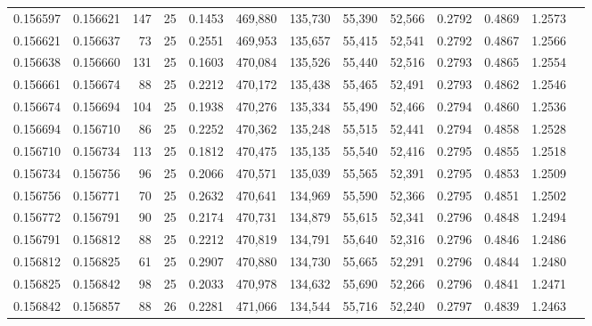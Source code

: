 \begin{tabular}{rrrrrrrrrrrrr}
0.156597 & 0.156621 &   147 &  25 &                                     0.1453 & 469,880 & 135,730 &  55,390 &  52,566 & 0.2792 & 0.4869 & 1.2573 \\
0.156621 & 0.156637 &    73 &  25 &                                     0.2551 & 469,953 & 135,657 &  55,415 &  52,541 & 0.2792 & 0.4867 & 1.2566 \\
0.156638 & 0.156660 &   131 &  25 &                                     0.1603 & 470,084 & 135,526 &  55,440 &  52,516 & 0.2793 & 0.4865 & 1.2554 \\
0.156661 & 0.156674 &    88 &  25 &                                     0.2212 & 470,172 & 135,438 &  55,465 &  52,491 & 0.2793 & 0.4862 & 1.2546 \\
0.156674 & 0.156694 &   104 &  25 &                                     0.1938 & 470,276 & 135,334 &  55,490 &  52,466 & 0.2794 & 0.4860 & 1.2536 \\
0.156694 & 0.156710 &    86 &  25 &                                     0.2252 & 470,362 & 135,248 &  55,515 &  52,441 & 0.2794 & 0.4858 & 1.2528 \\
0.156710 & 0.156734 &   113 &  25 &                                     0.1812 & 470,475 & 135,135 &  55,540 &  52,416 & 0.2795 & 0.4855 & 1.2518 \\
0.156734 & 0.156756 &    96 &  25 &                                     0.2066 & 470,571 & 135,039 &  55,565 &  52,391 & 0.2795 & 0.4853 & 1.2509 \\
0.156756 & 0.156771 &    70 &  25 &                                     0.2632 & 470,641 & 134,969 &  55,590 &  52,366 & 0.2795 & 0.4851 & 1.2502 \\
0.156772 & 0.156791 &    90 &  25 &                                     0.2174 & 470,731 & 134,879 &  55,615 &  52,341 & 0.2796 & 0.4848 & 1.2494 \\
0.156791 & 0.156812 &    88 &  25 &                                     0.2212 & 470,819 & 134,791 &  55,640 &  52,316 & 0.2796 & 0.4846 & 1.2486 \\
0.156812 & 0.156825 &    61 &  25 &                                     0.2907 & 470,880 & 134,730 &  55,665 &  52,291 & 0.2796 & 0.4844 & 1.2480 \\
0.156825 & 0.156842 &    98 &  25 &                                     0.2033 & 470,978 & 134,632 &  55,690 &  52,266 & 0.2796 & 0.4841 & 1.2471 \\
0.156842 & 0.156857 &    88 &  26 &                                     0.2281 & 471,066 & 134,544 &  55,716 &  52,240 & 0.2797 & 0.4839 & 1.2463 \\

\end{tabular}
